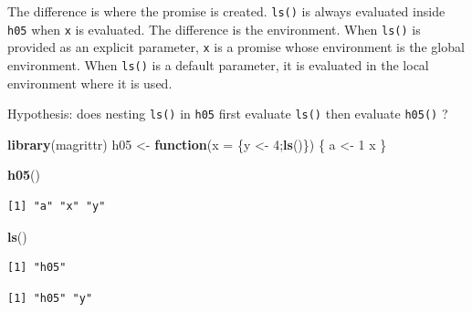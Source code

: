 \documentclass[]{book}
\newenvironment{Shaded}{\begin{snugshade}}{\end{snugshade}}
\newcommand{\ControlFlowTok}[1]{\textcolor[rgb]{0.13,0.29,0.53}{\textbf{#1}}}
\newcommand{\DataTypeTok}[1]{\textcolor[rgb]{0.13,0.29,0.53}{#1}}
\newcommand{\DecValTok}[1]{\textcolor[rgb]{0.00,0.00,0.81}{#1}}
\newcommand{\KeywordTok}[1]{\textcolor[rgb]{0.13,0.29,0.53}{\textbf{#1}}}
\newcommand{\NormalTok}[1]{#1}
\newcommand{\OperatorTok}[1]{\textcolor[rgb]{0.81,0.36,0.00}{\textbf{#1}}}
\newcommand{\StringTok}[1]{\textcolor[rgb]{0.31,0.60,0.02}{#1}}
\begin{document}
The difference is where the promise is created. \texttt{ls()} is always evaluated inside \texttt{h05} when \texttt{x} is evaluated. The difference is the environment. When \texttt{ls()} is provided as an explicit parameter, \texttt{x} is a promise whose environment is the global environment. When \texttt{ls()} is a default parameter, it is evaluated in the local environment where it is used.

Hypothesis: does nesting \texttt{ls()} in \texttt{h05} first evaluate \texttt{ls()} then evaluate \texttt{h05()} ?

\begin{Shaded}
\begin{Highlighting}[]
\KeywordTok{library}\NormalTok{(magrittr)}
\NormalTok{h05 <-}\StringTok{ }\ControlFlowTok{function}\NormalTok{(}\DataTypeTok{x =}\NormalTok{ \{y <-}\StringTok{ }\DecValTok{4}\NormalTok{;}\KeywordTok{ls}\NormalTok{()\}) \{}
\NormalTok{   a <-}\StringTok{ }\DecValTok{1}
\NormalTok{   x}
\NormalTok{\}}
\end{Highlighting}
\end{Shaded}

\begin{Shaded}
\begin{Highlighting}[]
\KeywordTok{h05}\NormalTok{()}
\end{Highlighting}
\end{Shaded}

\begin{verbatim}
[1] "a" "x" "y"
\end{verbatim}

\begin{Shaded}
\begin{Highlighting}[]
\KeywordTok{ls}\NormalTok{()}
\end{Highlighting}
\end{Shaded}

\begin{verbatim}
[1] "h05"
\end{verbatim}

\begin{Shaded}
\end{Shaded}

\begin{verbatim}
[1] "h05" "y"  
\end{verbatim}
\end{document}
